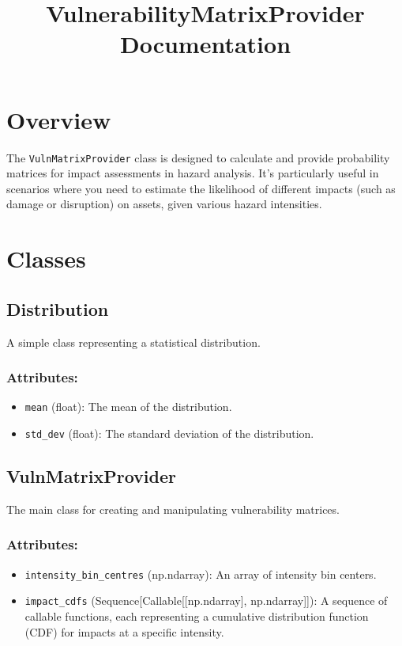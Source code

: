 \documentclass{article}
\title{VulnerabilityMatrixProvider Documentation}
\author{}
\date{}
\begin{document}
\maketitle

\section{Overview}

The \texttt{VulnMatrixProvider} class is designed to calculate and provide probability matrices for impact assessments in hazard analysis. It's particularly useful in scenarios where you need to estimate the likelihood of different impacts (such as damage or disruption) on assets, given various hazard intensities.

\section{Classes}

\subsection{Distribution}

A simple class representing a statistical distribution.

\subsubsection{Attributes:}
\begin{itemize}
    \item \texttt{mean} (float): The mean of the distribution.
    \item \texttt{std\_dev} (float): The standard deviation of the distribution.
\end{itemize}

\subsection{VulnMatrixProvider}

The main class for creating and manipulating vulnerability matrices.

\subsubsection{Attributes:}
\begin{itemize}
    \item \texttt{intensity\_bin\_centres} (np.ndarray): An array of intensity bin centers.
    \item \texttt{impact\_cdfs} (Sequence[Callable[[np.ndarray], np.ndarray]]): A sequence of callable functions, each representing a cumulative distribution function (CDF) for impacts at a specific intensity.
\end{itemize}
\end{document}
